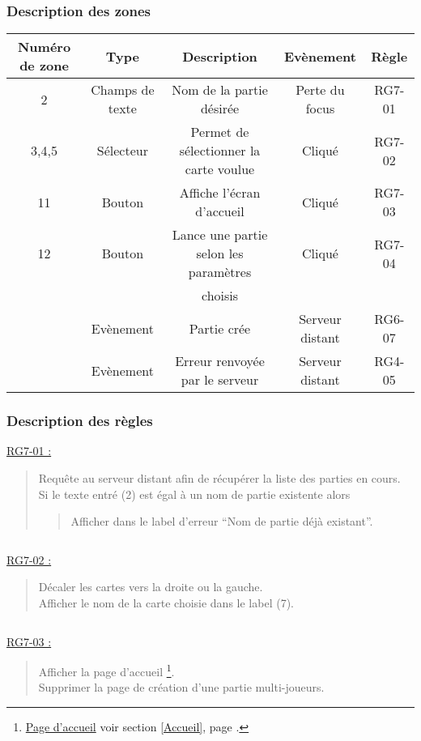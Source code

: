 \documentclass{report}
\begin{document}
		\subsubsection{Description des zones}
		
			\begin{tabular}{|c|c|c|c|c|} \hline
				Numéro de zone & Type  & Description & Evènement &	Règle \\\hline
				2 & Champs de texte & Nom de la partie désirée & Perte du focus & RG7-01 \\\hline
				3,4,5 & Sélecteur & Permet de sélectionner la carte voulue & Cliqué & RG7-02 \\\hline
				11 & Bouton & Affiche l'écran d'accueil & Cliqué & RG7-03 \\\hline
				12 & Bouton & Lance une partie selon les paramètres & Cliqué & RG7-04 \\
				   &        & choisis &        & \\\hline
				   & Evènement & Partie crée & Serveur distant & RG6-07 \\\hline
				   & Evènement & Erreur renvoyée par le serveur & Serveur distant & RG4-05 \\\hline
			\end{tabular}
			
		\subsubsection{Description des règles}
		
			\underline{RG7-01 :}
				\begin{quote}
					Requête au serveur distant afin de récupérer la liste des parties en cours.\\
					Si le texte entré (2) est égal à un nom de partie existente alors
					\begin{quote}
						Afficher dans le label d'erreur ``Nom de partie déjà existant''.
					\end{quote}
				\end{quote}

			$\,$				

			\underline{RG7-02 :}
				\begin{quote}
					Décaler les cartes vers la droite ou la gauche.\\
					Afficher le nom de la carte choisie dans le label (7).
				\end{quote}
				
			$\,$				

			\underline{RG7-03 :}
				\begin{quote}
					Afficher la page d'accueil%
						\footnote[1]{
							\hyperlink{Page d'accueil}{Page d'accueil}
							\og voir section \ref{Accueil}, page \pageref{Accueil}.\fg
						}.\\
					Supprimer la page de création d'une partie multi-joueurs.
				\end{quote}
				
\end{document}
